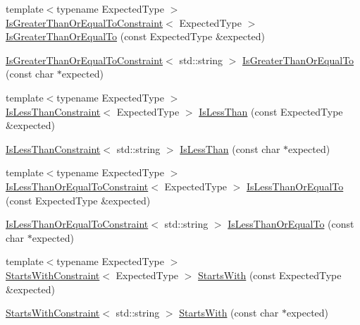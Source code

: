 \begin{DoxyCompactItemize}
\item 
{\footnotesize template$<$typename Expected\+Type $>$ }\\\mbox{\hyperlink{structsnowhouse_1_1IsGreaterThanOrEqualToConstraint}{Is\+Greater\+Than\+Or\+Equal\+To\+Constraint}}$<$ Expected\+Type $>$ \mbox{\hyperlink{namespacesnowhouse_a6a0accf040dae78744a15f7289b78fb1}{Is\+Greater\+Than\+Or\+Equal\+To}} (const Expected\+Type \&expected)
\item 
\mbox{\hyperlink{structsnowhouse_1_1IsGreaterThanOrEqualToConstraint}{Is\+Greater\+Than\+Or\+Equal\+To\+Constraint}}$<$ std\+::string $>$ \mbox{\hyperlink{namespacesnowhouse_a48bf11962bead2223eb70819f7ce495b}{Is\+Greater\+Than\+Or\+Equal\+To}} (const char $\ast$expected)
\item 
{\footnotesize template$<$typename Expected\+Type $>$ }\\\mbox{\hyperlink{structsnowhouse_1_1IsLessThanConstraint}{Is\+Less\+Than\+Constraint}}$<$ Expected\+Type $>$ \mbox{\hyperlink{namespacesnowhouse_a51cc77a599d046da4f1129abae92cd1f}{Is\+Less\+Than}} (const Expected\+Type \&expected)
\item 
\mbox{\hyperlink{structsnowhouse_1_1IsLessThanConstraint}{Is\+Less\+Than\+Constraint}}$<$ std\+::string $>$ \mbox{\hyperlink{namespacesnowhouse_a3649eb1115a0aa953744743363ea7349}{Is\+Less\+Than}} (const char $\ast$expected)
\item 
{\footnotesize template$<$typename Expected\+Type $>$ }\\\mbox{\hyperlink{structsnowhouse_1_1IsLessThanOrEqualToConstraint}{Is\+Less\+Than\+Or\+Equal\+To\+Constraint}}$<$ Expected\+Type $>$ \mbox{\hyperlink{namespacesnowhouse_a9e5d2797c368840b39f8f6664ce9621f}{Is\+Less\+Than\+Or\+Equal\+To}} (const Expected\+Type \&expected)
\item 
\mbox{\hyperlink{structsnowhouse_1_1IsLessThanOrEqualToConstraint}{Is\+Less\+Than\+Or\+Equal\+To\+Constraint}}$<$ std\+::string $>$ \mbox{\hyperlink{namespacesnowhouse_a1f4f78727bcf2751127320342bf5f305}{Is\+Less\+Than\+Or\+Equal\+To}} (const char $\ast$expected)
\item 
{\footnotesize template$<$typename Expected\+Type $>$ }\\\mbox{\hyperlink{structsnowhouse_1_1StartsWithConstraint}{Starts\+With\+Constraint}}$<$ Expected\+Type $>$ \mbox{\hyperlink{namespacesnowhouse_a4c3de58641163329edc3910f685bd042}{Starts\+With}} (const Expected\+Type \&expected)
\item 
\mbox{\hyperlink{structsnowhouse_1_1StartsWithConstraint}{Starts\+With\+Constraint}}$<$ std\+::string $>$ \mbox{\hyperlink{namespacesnowhouse_a02ff38db9b4a0b5b9bd60f9ee329cd7b}{Starts\+With}} (const char $\ast$expected)

\end{DoxyCompactItemize}
